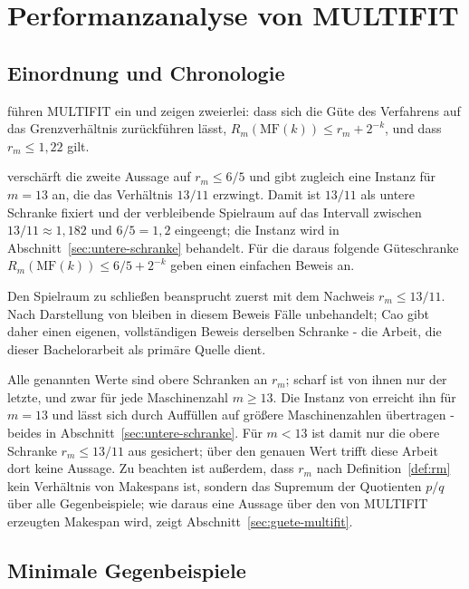 \chapter{Performanzanalyse von MULTIFIT}
\label{chap:performanz}

\section{Einordnung und Chronologie}
\label{sec:chronologie}

\textcite{coffman1978} führen MULTIFIT ein und zeigen zweierlei: dass sich die Güte des
Verfahrens auf das Grenzverhältnis zurückführen lässt, $R_m(\mathrm{MF}(k)) \le r_m + 2^{-k}$,
und dass $r_m \le 1{,}22$ gilt.

\textcite{friesen1984} verschärft die zweite Aussage auf $r_m \le 6/5$ und gibt zugleich eine
Instanz für $m = 13$ an, die das Verhältnis $13/11$ erzwingt.
Damit ist $13/11$ als untere Schranke fixiert und der verbleibende Spielraum auf das Intervall
zwischen $13/11 \approx 1{,}182$ und $6/5 = 1{,}2$ eingeengt; die Instanz wird in
Abschnitt~\ref{sec:untere-schranke} behandelt.
Für die daraus folgende Güteschranke $R_m(\mathrm{MF}(k)) \le 6/5 + 2^{-k}$ geben
\textcite{yue_kellerer_yu1988} einen einfachen Beweis an.

Den Spielraum zu schließen beansprucht zuerst \textcite{yue1990} mit dem Nachweis
$r_m \le 13/11$.
Nach Darstellung von \textcite{cao1995} bleiben in diesem Beweis Fälle unbehandelt; Cao gibt
daher einen eigenen, vollständigen Beweis derselben Schranke - die Arbeit, die dieser
Bachelorarbeit als primäre Quelle dient.

Alle genannten Werte sind obere Schranken an $r_m$; scharf ist von ihnen nur der letzte, und
zwar für jede Maschinenzahl $m \ge 13$.
Die Instanz von \textcite{friesen1984} erreicht ihn für $m = 13$ und lässt sich durch Auffüllen
auf größere Maschinenzahlen übertragen - beides in Abschnitt~\ref{sec:untere-schranke}.
Für $m < 13$ ist damit nur die obere Schranke $r_m \le 13/11$ aus \cite{cao1995} gesichert;
über den genauen Wert trifft diese Arbeit dort keine Aussage.
Zu beachten ist außerdem, dass $r_m$ nach Definition~\ref{def:rm} kein Verhältnis von
Makespans ist, sondern das Supremum der Quotienten $p/q$ über alle Gegenbeispiele; wie daraus
eine Aussage über den von MULTIFIT erzeugten Makespan wird, zeigt
Abschnitt~\ref{sec:guete-multifit}.

\section{Minimale Gegenbeispiele}
\label{sec:minimale-gegenbeispiele}

